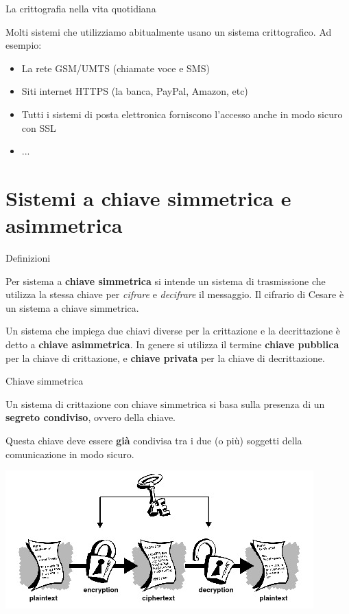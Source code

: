 \documentclass[10pt]{beamer}
\begin{document}
\begin{frame}[fragile]{La crittografia nella vita quotidiana}

Molti sistemi che utilizziamo abitualmente usano un sistema crittografico. Ad esempio:

\begin{itemize}
\item La rete GSM/UMTS (chiamate voce e SMS)
\item Siti internet HTTPS (la banca, PayPal, Amazon, etc)
\item Tutti i sistemi di posta elettronica forniscono l'accesso anche in modo sicuro con SSL
\item ...
\end{itemize}

\end{frame}

\section{Sistemi a chiave simmetrica e asimmetrica}

\begin{frame}[fragile]{Definizioni}

Per sistema a \textbf{chiave simmetrica} si intende un sistema di trasmissione che utilizza la stessa chiave per \textit{cifrare} e \textit{decifrare} il messaggio. Il cifrario di Cesare è un sistema a chiave simmetrica.

Un sistema che impiega due chiavi diverse per la crittazione e la decrittazione è detto a \textbf{chiave asimmetrica}. In genere si utilizza il termine \textbf{chiave pubblica} per la chiave di crittazione, e \textbf{chiave privata} per la chiave di decrittazione.

\end{frame}

\begin{frame}{Chiave simmetrica}

Un sistema di crittazione con chiave simmetrica si basa sulla presenza di un \textbf{segreto condiviso}, ovvero della chiave.

Questa chiave deve essere \textbf{già} condivisa tra i due (o più) soggetti della comunicazione in modo sicuro.

\centering
\includegraphics[scale=0.5]{symmetric-cryptography}

\end{frame}
\end{document}
